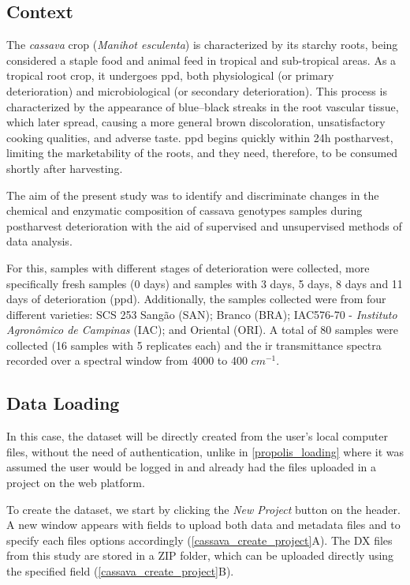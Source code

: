 \subsection{Context}

The \textit{cassava} crop (\textit{Manihot esculenta}) is characterized by its starchy roots, being considered a staple food and animal feed in tropical and sub-tropical areas. As a tropical root crop, it undergoes \acrfull{ppd}, both physiological (or primary deterioration) and microbiological (or secondary deterioration). This process is characterized by the appearance of blue–black streaks in the root vascular tissue, which later spread, causing a more general brown discoloration, unsatisfactory cooking qualities, and adverse taste. \gls{ppd} begins quickly within 24h postharvest, limiting the marketability of the roots, and they need, therefore, to be consumed shortly after harvesting.

The aim of the present study was to identify and discriminate changes in the chemical and enzymatic composition of cassava genotypes samples during postharvest deterioration with the aid of supervised and unsupervised methods of data analysis.

For this, samples with different stages of deterioration were collected, more specifically fresh samples (0 days) and samples with 3 days, 5 days, 8 days and 11 days of deterioration (\gls{ppd}). Additionally, the samples collected were from four different varieties: SCS 253 Sangão (SAN); Branco (BRA); IAC576-70 - \textit{Instituto Agronômico de Campinas} (IAC); and Oriental (ORI). A total of 80 samples were collected (16 samples with 5 replicates each) and the \gls{ir} transmittance spectra recorded over a spectral window from 4000 to 400 $cm^{-1}$.


\subsection{Data Loading}

In this case, the dataset will be directly created from the user's local computer files, without the need of authentication, unlike in \autoref{propolis_loading} where it was assumed the user would be logged in and already had the files uploaded in a project on the web platform.

To create the dataset, we start by clicking the \textit{New Project} button on the header. A new window appears with fields to upload both data and metadata files and to specify each files options accordingly (\autoref{cassava_create_project}A). The DX files from this study are stored in a ZIP folder, which can be uploaded directly using the specified field (\autoref{cassava_create_project}B).

